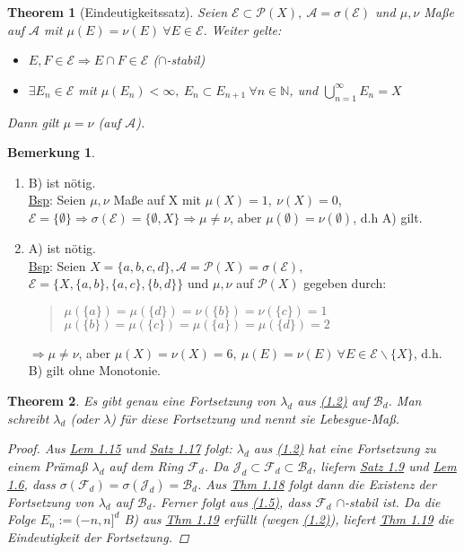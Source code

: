 \documentclass[a4paper]{scrreprt}
\newcommand{\PowerSet}{\mathcal{P}}
\newcommand{\N}{\mathbb{N}}
\newcommand{\Borel}{\mathcal{B}}
\newcommand{\Bd}{\Borel_d}
\newcommand{\Fd}{\mathcal{F}_d}
\newcommand{\Jd}{\mathcal{J}_d}
\newcommand{\jlabel}[1]{\label{j_#1}}
\newcommand{\jhyperref}[2]{\hyperref[j_#1]{#2}}
\newcommand{\jlink}[1]{\jhyperref{#1}{#1}}
\theoremstyle{plain}
\newtheorem{thm}{Theorem}[chapter]
\theoremstyle{definition}
\newtheorem*{bem*}{Bemerkung}
\begin{document}
{{{\begin{thm}[Eindeutigkeitssatz]
\jlabel{Thm 1.19}
    Seien $\mathcal{E} \subset \PowerSet(X), \ \mathcal{A} = \sigma(\mathcal{E})$ und $\mu,\nu$ Maße auf $\mathcal{A}$ mit $\mu(E)=\nu(E) \ \forall E \in \mathcal{E}$. Weiter gelte:
    \begin{itemize}
        \item[A)] $E,F \in \mathcal{E} \Rightarrow E\cap F \in \mathcal{E}$ ($\cap$-stabil)
        \item[B)] $\exists E_n \in \mathcal{E}$ mit $\mu(E_n) < \infty,\ E_n \subset E_{n+1} \ \forall n\in\N$, und $\bigcup_{n=1}^\infty E_n = X$
    \end{itemize}
    Dann gilt $\mu = \nu$ (auf $\mathcal{A}$).
\end{thm}

\begin{bem*}
    \begin{enumerate}
        \item
            B) ist nötig.\\
            \uline{Bsp}: Seien $\mu,\nu$ Maße auf X mit $\mu(X)=1,\ \nu(X) = 0$, $\mathcal{E} = \{\emptyset\} \Rightarrow \sigma(\mathcal{E}) = \{\emptyset, X\} \Rightarrow \mu \neq \nu$, aber $\mu(\emptyset) =  \nu(\emptyset)$, d.h A) gilt.
        \item
            A) ist nötig.\\
            \uline{Bsp}: Seien $X=\{a,b,c,d\}, \mathcal{A}=\PowerSet(X)=\sigma(\mathcal{E}),$\\
            $\mathcal{E}=\{X, \{a,b\},\{a,c\},\{b,d\}\}$ und $\mu,\nu$ auf $\PowerSet(X)$ gegeben durch:
            \begin{quote}
                $\mu(\{a\})=\mu(\{d\})=\nu(\{b\})=\nu(\{c\})=1$\\
                $\mu(\{b\})=\mu(\{c\})=\mu(\{a\})=\mu(\{d\})=2$
            \end{quote}
            $\Rightarrow \mu\ne\nu$, aber $\mu(X)=\nu(X)=6,\ \mu(E)=\nu(E)\ \forall E\in \mathcal{E} \backslash \{X\}$, d.h. B) gilt ohne Monotonie.
    \end{enumerate}
\end{bem*}


\begin{thm}
\jlabel{Thm 1.20}
    Es gibt genau eine Fortsetzung von $\lambda_d$ aus \jlink{(1.2)} auf $\Bd$. Man schreibt $\lambda_d$ (oder $\lambda$) für diese Fortsetzung und nennt sie Lebesgue-Maß.
    \begin{proof}
        Aus \jlink{Lem 1.15} und \jlink{Satz 1.17} folgt: $\lambda_d$ aus \jlink{(1.2)} hat eine Fortsetzung zu einem Prämaß $\lambda_d$ auf dem Ring $\Fd$. Da $\Jd \subset \Fd \subset \Bd$, liefern \jlink{Satz 1.9} und \jlink{Lem 1.6}, dass $\sigma(\Fd)=\sigma(\Jd)=\Bd$. Aus \jlink{Thm 1.18} folgt dann die Existenz der Fortsetzung von $\lambda_d$ auf $\Bd$. Ferner folgt aus \jlink{(1.5)}, dass $\Fd$ $\cap$-stabil ist. Da die Folge $E_n := (-n,n]^d$ B) aus \jlink{Thm 1.19} erfüllt (wegen \jlink{(1.2)}), liefert \jlink{Thm 1.19} die Eindeutigkeit der Fortsetzung.
    \end{proof}
\end{thm}


}}}
\end{document}
